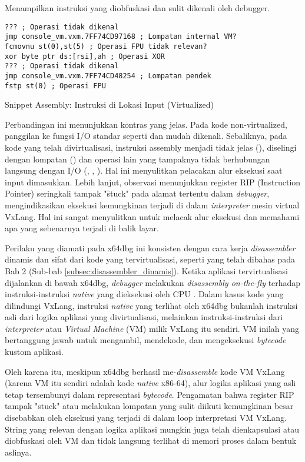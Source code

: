  Menampilkan instruksi yang diobfuskasi dan sulit dikenali oleh debugger.
\begin{listing}[H]
    \begin{verbatim}
??? ; Operasi tidak dikenal
jmp console_vm.vxm.7FF74CD97168 ; Lompatan internal VM?
fcmovnu st(0),st(5) ; Operasi FPU tidak relevan?
xor byte ptr ds:[rsi],ah ; Operasi XOR
??? ; Operasi tidak dikenal
jmp console_vm.vxm.7FF74CD48254 ; Lompatan pendek
fstp st(0) ; Operasi FPU
\end{verbatim}
\caption{Snippet Assembly: Instruksi di Lokasi Input (Virtualized)}
\label{lst:asm_dynamic_io_virt_snippet} %
\end{listing}

Perbandingan ini menunjukkan kontras yang jelas. Pada kode non-virtualized, panggilan ke fungsi I/O standar seperti  dan  mudah dikenali. Sebaliknya, pada kode yang telah divirtualisasi, instruksi assembly menjadi tidak jelas (), diselingi dengan lompatan () dan operasi lain yang tampaknya tidak berhubungan langsung dengan I/O (, , ). Hal ini menyulitkan pelacakan alur eksekusi saat input dimasukkan. Lebih lanjut, observasi menunjukkan register RIP (\f{Instruction Pointer}) seringkali tampak "\f{stuck}" pada alamat tertentu dalam \textit{debugger}, mengindikasikan eksekusi kemungkinan terjadi di dalam \textit{interpreter} mesin virtual VxLang. Hal ini sangat menyulitkan untuk melacak alur eksekusi dan memahami apa yang sebenarnya terjadi di balik layar. 

Perilaku yang diamati pada x64dbg ini konsisten dengan cara kerja \textit{disassembler} dinamis dan sifat dari kode yang tervirtualisasi, seperti yang telah dibahas pada Bab 2 (Sub-bab \ref{subsec:disassembler_dinamis}). Ketika aplikasi tervirtualisasi dijalankan di bawah x64dbg, \textit{debugger} melakukan \textit{disassembly on-the-fly} terhadap instruksi-instruksi \textit{native} yang dieksekusi oleh CPU \cite{Sikorski2012}. Dalam kasus kode yang dilindungi VxLang, instruksi \textit{native} yang terlihat oleh x64dbg bukanlah instruksi asli dari logika aplikasi yang divirtualisasi, melainkan instruksi-instruksi dari \textit{interpreter} atau \textit{Virtual Machine} (VM) milik VxLang itu sendiri. VM inilah yang bertanggung jawab untuk mengambil, mendekode, dan mengeksekusi \textit{bytecode} kustom aplikasi.

Oleh karena itu, meskipun x64dbg berhasil me-\textit{disassemble} kode VM VxLang (karena VM itu sendiri adalah kode \textit{native} x86-64), alur logika aplikasi yang asli tetap tersembunyi dalam representasi \textit{bytecode}. Pengamatan bahwa register RIP tampak "stuck" atau melakukan lompatan yang sulit diikuti kemungkinan besar disebabkan oleh eksekusi yang terjadi di dalam loop interpretasi VM VxLang. String yang relevan dengan logika aplikasi mungkin juga telah dienkapsulasi atau diobfuskasi oleh VM dan tidak langsung terlihat di memori proses dalam bentuk aslinya.

